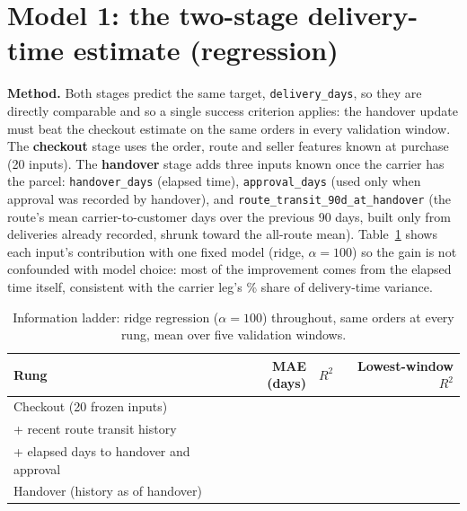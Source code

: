 \documentclass[12pt,a4paper]{article}
\begin{document}
\section*{Model 1: the two-stage delivery-time estimate (regression)}
\textbf{Method.} Both stages predict the same target, \texttt{delivery\_days}, so they are directly comparable and so a single success criterion applies: the handover update must beat the checkout estimate on the same orders in every validation window. The \textbf{checkout} stage uses the order, route and seller features known at purchase (20 inputs). The \textbf{handover} stage adds three inputs known once the carrier has the parcel: \texttt{handover\_days} (elapsed time), \texttt{approval\_days} (used only when approval was recorded by handover), and \texttt{route\_transit\_90d\_at\_handover} (the route's mean carrier-to-customer days over the previous 90 days, built only from deliveries already recorded, shrunk toward the all-route mean). Table~\ref{tab:ladder} shows each input's contribution with one fixed model (ridge, \(\alpha=100\)) so the gain is not confounded with model choice: most of the improvement comes from the elapsed time itself, consistent with the carrier leg's \CarrierShare{}\% share of delivery-time variance.

\begin{table}[ht]
\centering\small
\caption{Information ladder: ridge regression (\(\alpha=100\)) throughout, same orders at every rung, mean over five validation windows.}
\label{tab:ladder}
\begin{tabular}{@{}lrrr@{}}
\toprule
Rung & MAE (days) & \(R^2\) & Lowest-window \(R^2\) \\
\midrule
Checkout (20 frozen inputs) & \LadderCheckoutMAE{} & \LadderCheckoutRSq{} & \LadderCheckoutMinRSq{} \\
+ recent route transit history & \LadderTransitMAE{} & \LadderTransitRSq{} & \LadderTransitMinRSq{} \\
+ elapsed days to handover and approval & \LadderElapsedMAE{} & \LadderElapsedRSq{} & \LadderElapsedMinRSq{} \\
Handover (history as of handover) & \LadderHandoverMAE{} & \LadderHandoverRSq{} & \LadderHandoverMinRSq{} \\
\bottomrule
\end{tabular}
\end{table}
\end{document}
